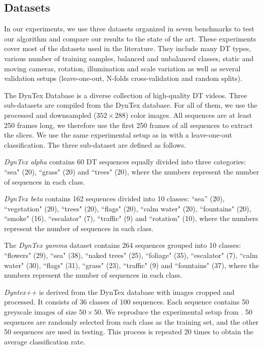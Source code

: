 \documentclass[a4paper,11pt]{article}
\begin{document}
\subsection{Datasets}%
\label{subsec:Datasets}
In our experiments, we use three datasets organized in seven benchmarks to test our algorithm and compare our results to the state of the art.
These experiments cover most of the datasets used in the literature.
They include many DT types, various number of training samples, balanced and unbalanced classes, static and moving cameras, rotation, illumination and scale variation as well as several validation setups (leave-one-out, N-folds cross-validation and random splits).

The DynTex Database \cite{peteri2010dyntex} is a diverse collection of high-quality DT videos.
Three sub-datasets are compiled from the DynTex database. For all of them, we use the processed and downsampled ($352\times 288$) color images.
All sequences are at least 250 frames long, we therefore use the first 250 frames of all sequences to extract the slices. 
We use the same experimental setup as in \cite{qi2016dynamic} with a leave-one-out classification.
The three sub-dataset are defined as follows.

\textit{DynTex alpha} contains 60 DT sequences equally divided into three categories: ``sea" (20), ``grass" (20) and ``trees" (20), where the numbers represent the number of sequences in each class.

\textit{DynTex beta} contains 162 sequences divided into 10 classes:
``sea'' (20), ``vegetation" (20), ``trees" (20), ``flags" (20), ``calm water" (20), ``fountains" (20), ``smoke" (16), ``escalator" (7), ``traffic" (9) and ``rotation" (10), where the numbers represent the number of sequences in each class.

The \textit{DynTex gamma} dataset \cite{peteri2010dyntex} contains 264 sequences grouped into 10 classes:
``flowers" (29), ``sea" (38), ``naked trees" (25), ``foliage" (35), ``escalator" (7), ``calm water" (30), ``flags" (31), ``grass" (23), ``traffic" (9) and ``fountains" (37), where the numbers represent the number of sequences in each class.


\textit{Dyntex++} \cite{ghanem2010maximum} is derived from the DynTex database with images cropped and processed. It consists of 36 classes of 100 sequences.
Each sequence contains 50 greyscale images of size $50\times 50$. 
We reproduce the experimental setup from \cite{ghanem2010maximum,tiwari2016improved,andrearczyk2015dynamic}.
50 sequences are randomly selected from each class as the training set, and the other 50 sequences are used in testing. This
process is repeated 20 times to obtain the average classification rate.
\end{document}
